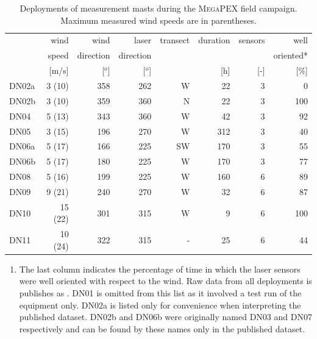 \begin{table}[h]
  \centering
  \caption{Deployments of measurement masts during the \textsc{MegaPEX} field
    campaign. Maximum measured wind speeds are in parentheses.}
  \label{tab:deployments}
  \begin{tabular}[h]{lrrrrrrr}
    \hline
               & wind       &  wind      & laser      &   transect &   duration & sensors &     well \\
               & speed      & direction  & direction  &            &            &      &     oriented* \\
               &      [m/s] &     [$^o$] &     [$^o$] &            &        [h] &     [-] &       [\%] \\
    \hline
    DN02a      &     3 (10) &        358 &        262 &          W &         22 &       3 &          0 \\
    DN02b      &     3 (10) &        359 &        360 &          N &         22 &       3 &        100 \\
    DN04       &     5 (13) &        343 &        360 &          W &         42 &       3 &         92 \\
    DN05       &     3 (15) &        196 &        270 &          W &        312 &       3 &         40 \\
    DN06a      &     5 (17) &        166 &        225 &         SW &        170 &       3 &         55 \\
    DN06b      &     5 (17) &        180 &        225 &          W &        170 &       3 &         77 \\
    DN08       &     5 (16) &        199 &        225 &          W &        160 &       6 &         89 \\
    DN09       &     9 (21) &        240 &        270 &          W &         32 &       6 &         87 \\
    DN10       &    15 (22) &        301 &        315 &          W &          9 &       6 &        100 \\
    DN11       &    10 (24) &        322 &        315 &          - &         25 &       6 &         44 \\
    \hline
  \end{tabular}

  \footnotesize{
    \begin{enumerate}[{*}]
    \item The last column indicates the percentage of time in which
      the laser sensors were well oriented with respect to the wind.
      Raw data from all deployments is publishes as \citet{megapex}.
      DN01 is omitted from this list as it involved a test run of the
      equipment only. DN02a is listed only for convenience when
      interpreting the published dataset. DN02b and DN06b were
      originally named DN03 and DN07 respectively and can be found by
      these names only in the published dataset.
    \end{enumerate}}
\end{table}

